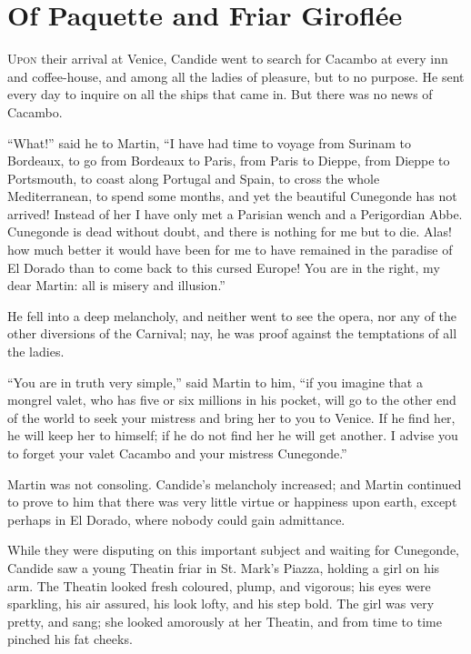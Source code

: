 \vspace{1cm}
\begingroup
\let\clearpage\relax
\chapter{Of Paquette and Friar Giroflée}
\endgroup
\vspace{-1cm}
\lettrine[lraise=0.1,nindent=0em,slope=-.5em]{U}{pon} their arrival at Venice, Candide went to search for Cacambo at every inn and coffee-house, and among all the ladies of pleasure, but to no purpose. He sent every day to inquire on all the ships that came in. But there was no news of Cacambo.

``What!'' said he to Martin, ``I have had time to voyage from Surinam to Bordeaux, to go from Bordeaux to Paris, from Paris to Dieppe, from Dieppe to Portsmouth, to coast along Portugal and Spain, to cross the whole Mediterranean, to spend some months, and yet the beautiful Cunegonde has not arrived! Instead of her I have only met a Parisian wench and a Perigordian Abbe. Cunegonde is dead without doubt, and there is nothing for me but to die. Alas! how much better it would have been for me to have remained in the paradise of El Dorado than to come back to this cursed Europe! You are in the right, my dear Martin: all is misery and illusion.''

He fell into a deep melancholy, and neither went to see the opera, nor any of the other diversions of the Carnival; nay, he was proof against the temptations of all the ladies.

``You are in truth very simple,'' said Martin to him, ``if you imagine that a mongrel valet, who has five or six millions in his pocket, will go to the other end of the world to seek your mistress and bring her to you to Venice. If he find her, he will keep her to himself; if he do not find her he will get another. I advise you to forget your valet Cacambo and your mistress Cunegonde.''

Martin was not consoling. Candide's melancholy increased; and Martin continued to prove to him that there was very little virtue or happiness upon earth, except perhaps in El Dorado, where nobody could gain admittance.

While they were disputing on this important subject and waiting for Cunegonde, Candide saw a young Theatin friar in St. Mark's Piazza, holding a girl on his arm. The Theatin looked fresh coloured, plump, and vigorous; his eyes were sparkling, his air assured, his look lofty, and his step bold. The girl was very pretty, and sang; she looked amorously at her Theatin, and from time to time pinched his fat cheeks.

